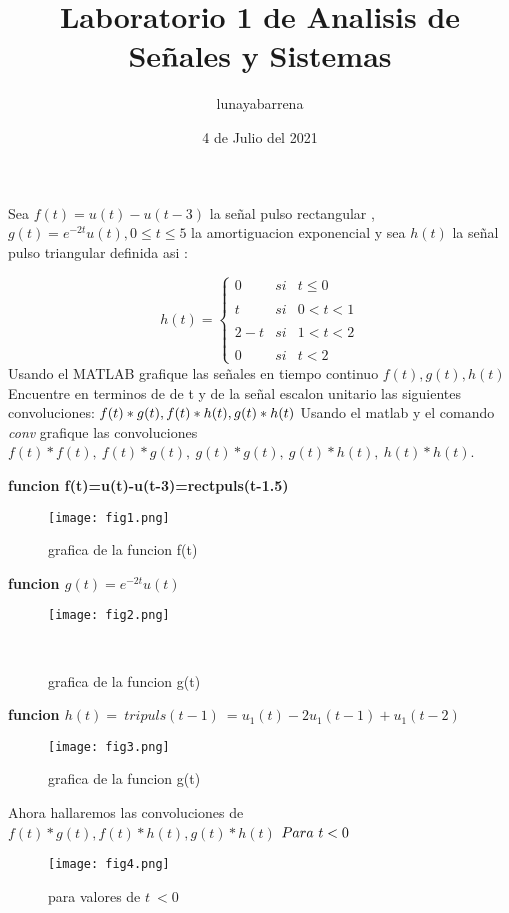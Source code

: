 \documentclass[12pt]{article}
\title{\textbf{Laboratorio 1 de Analisis de Señales y Sistemas}}
\author{lunayabarrena }
\date{4 de Julio del 2021}
\begin{document}
\maketitle

Sea $f(t)=u(t)-u(t-3)$ la señal pulso rectangular , $g(t)= e^{-2t}u(t) , 0\leq t\leq 5$ la  amortiguacion exponencial y sea $h(t)$ la señal  pulso triangular definida asi :

\[h(t)=\left\{ \begin{array}{lccc}
             0 &   si  & t \leq 0 \\
             \\ t &  si & 0 < t < 1 \\
             \\ 2-t &  si  & 1 < t < 2\\
             \\  0 & si &  t < 2
             \end{array}
   \right.
\]
Usando el MATLAB grafique las señales  en tiempo continuo $f(t) , g(t) , h(t)$\newline
Encuentre en terminos de  de t y de la señal escalon  unitario  las siguientes convoluciones: $f(t)*g(t) ,f(t)*h(t) ,g(t)*h(t)\newline  $
Usando el matlab y el comando \textit{conv} grafique las convoluciones $f(t)*f(t),\ f(t)*g(t), \ g(t)*g(t),\ g(t)*h(t),\ h(t)*h(t)$.\newline


\textbf{funcion f(t)=u(t)-u(t-3)=rectpuls(t-1.5)}
\begin{figure}[H]
    \centering
    \texttt{[image: fig1.png]}
    \caption{grafica de la funcion f(t)}
    \label{fig:my_label}
\end{figure}



\textbf{funcion $g(t)=e^{-2t}u(t)$}
\begin{figure}[H]
    \centering
    \texttt{[image: fig2.png]}
    \caption{grafica de la funcion g(t)}
    \
\end{figure}



\textbf{funcion $h(t)= \ tripuls(t-1) \ = u_1(t)-2u_1(t-1)+u_1(t-2) $}
\begin{figure}[H]
    \centering
    \texttt{[image: fig3.png]}
    \caption{grafica de la funcion g(t)}
\end{figure}
\newpage



Ahora hallaremos las convoluciones de \ $f(t)*g(t) ,f(t)*h(t) ,g(t)*h(t)$\newline \newline
{}
\newline$\\
Para  \ t<0$
\begin{figure}[H]
    \centering
    \texttt{[image: fig4.png]}
    \caption{para valores de $ t\ < 0$}
    \label{fig:my_label}
\end{figure}
\end{document}
